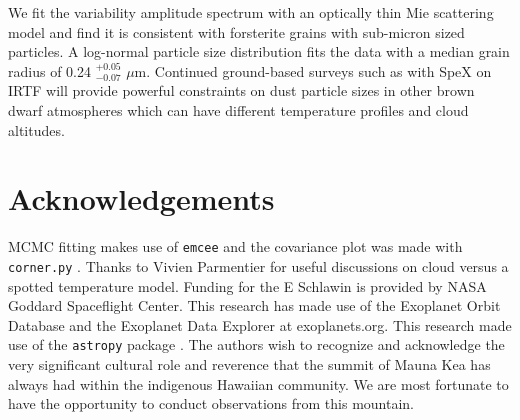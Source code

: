 \documentclass[twocolumn]{aastex6}
\begin{document}
We fit the variability amplitude spectrum with an optically thin Mie scattering model and find it is consistent with forsterite grains with sub-micron sized particles.
A log-normal particle size distribution fits the data with a median grain radius of 0.24 $^{+0.05}_{-0.07}$ $\mu$m.
Continued ground-based surveys such as with SpeX on IRTF will provide powerful constraints on dust particle sizes in other brown dwarf atmospheres which can have different temperature profiles and cloud altitudes.


\section{Acknowledgements}
MCMC fitting makes use of \texttt{emcee} \citep{foreman-mackey2013emcee} and the covariance plot was made with \texttt{corner.py} \citep{foremanCorner}.
Thanks to Vivien Parmentier for useful discussions on cloud versus a spotted temperature model.
Funding for the E Schlawin is provided by NASA Goddard Spaceflight Center.
This research has made use of the Exoplanet Orbit Database and the Exoplanet Data Explorer at exoplanets.org.
This research made use of the \texttt{astropy} package \citep{astropy2013}. The authors wish to recognize and acknowledge the very significant cultural role and reverence that the summit of Mauna Kea has always had within the indigenous Hawaiian community. We are most fortunate to have the opportunity to conduct observations from this mountain.


\end{document}
